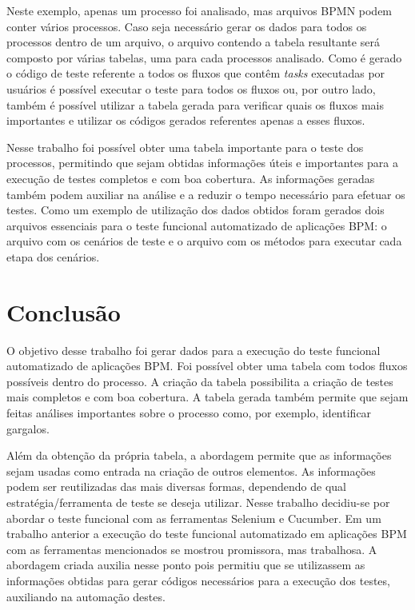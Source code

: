 \documentclass[12pt]{article}
\begin{document}
Neste exemplo, apenas um processo foi analisado, mas arquivos BPMN podem conter vários processos. Caso seja necessário gerar os dados para todos os processos dentro de um arquivo, o arquivo contendo a tabela resultante será composto por várias tabelas, uma para cada processos analisado. Como é gerado o código de teste referente a todos os fluxos que contêm \emph{tasks} executadas por usuários é possível executar o teste para todos os fluxos ou, por outro lado, também é possível utilizar a tabela gerada para verificar quais os fluxos mais importantes e utilizar os códigos gerados referentes apenas a esses fluxos.

Nesse trabalho foi possível obter uma tabela importante para o teste dos processos, permitindo que sejam obtidas informações úteis e importantes para a execução de testes completos e com boa cobertura. As informações geradas também podem auxiliar na análise e a reduzir o tempo necessário para efetuar os testes. Como um exemplo de utilização dos dados obtidos foram gerados dois arquivos essenciais para o teste funcional automatizado de aplicações BPM: o arquivo com os cenários de teste e o arquivo com os métodos para executar cada etapa dos cenários. %

\section{Conclusão}

O objetivo desse trabalho foi gerar dados para a execução do teste funcional automatizado de aplicações BPM. Foi possível obter uma tabela com todos fluxos possíveis dentro do processo. A criação da tabela possibilita a criação de testes mais completos e com boa cobertura. A tabela gerada também permite que sejam feitas análises importantes sobre o processo como, por exemplo, identificar gargalos.

Além da obtenção da própria tabela, a abordagem permite que as informações sejam usadas como entrada na criação de outros elementos. As informações podem ser reutilizadas das mais diversas formas, dependendo de qual estratégia/ferramenta de teste se deseja utilizar. Nesse trabalho decidiu-se por abordar o teste funcional com as ferramentas Selenium e Cucumber. Em um trabalho anterior a execução do teste funcional automatizado em aplicações BPM com as ferramentas mencionados se mostrou promissora, mas trabalhosa. A abordagem criada auxilia nesse ponto pois permitiu que se utilizassem as informações obtidas para gerar códigos necessários para a execução dos testes, auxiliando na automação destes.
\end{document}
